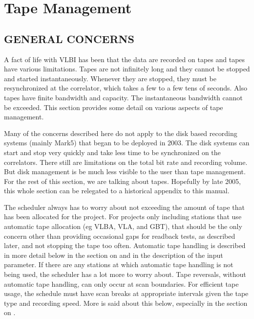 \documentclass{report}
\begin{document}
\section{\label{SSEC:TAPEMANAGEMENT}Tape Management}

\subsection{\label{SSSEC:TAPEGEN}GENERAL CONCERNS}

A fact of life with VLBI has been that the data are recorded on tapes
and tapes have various limitations.  Tapes are not infinitely long and
they cannot be stopped and started instantaneously.  Whenever they are
stopped, they must be resynchronized at the correlator, which takes a
few to a few tens of seconds.  Also tapes have finite bandwidth and
capacity.  The instantaneous bandwidth cannot be exceeded.  This
section provides some detail on various aspects of tape management.

Many of the concerns described here do not apply to the disk based
recording systems (mainly Mark5) that began to be deployed in 2003.
The disk systems can start and stop very quickly and take less time to
be synchronized on the correlators.  There still are limitations on
the total bit rate and recording volume.  But disk management is be
much less visible to the user than tape management.  For the rest of
this section, we are talking about tapes.  Hopefully by late 2005,
this whole section can be relegated to a historical appendix to this
manual.

The scheduler always has to worry about not exceeding the amount of
tape that has been allocated for the project.  For projects only
including stations that use automatic tape allocation (eg VLBA, VLA,
and GBT), that should be the only concern other than providing
occasional gaps for readback tests, as described later, and not
stopping the tape too often.  Automatic tape handling is described in
more detail below in the section on  and in the description of the
 input parameter.  If there are
any stations at which automatic tape handling is not being used, the
scheduler has a lot more to worry about.  Tape reversals, without
automatic tape handling, can only occur at scan boundaries.  For
efficient tape usage, the schedule must have scan breaks at
appropriate intervals given the tape type and recording speed.  More
is said about this below, especially in the section on .
\end{document}
